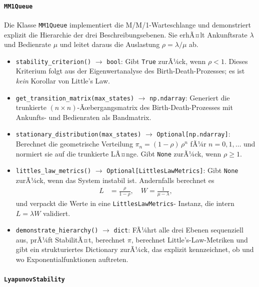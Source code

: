 ﻿\documentclass[a4paper,12pt]{report}
\theoremstyle{definition}
\begin{document}
\paragraph{\texttt{MM1Queue}}

Die Klasse \texttt{MM1Queue} implementiert die M/M/1-Warteschlange
und demonstriert explizit die Hierarchie der drei
Beschreibungsebenen.  Sie erhÃ¤lt Ankunftsrate $\lambda$ und
Bedienrate $\mu$ und leitet daraus die Auslastung $\rho = \lambda/\mu$
ab.

\begin{itemize}
	\item \texttt{stability\_criterion()} $\to$ \texttt{bool}:
	Gibt \texttt{True} zurÃ¼ck, wenn $\rho < 1$.  Dieses
	Kriterium folgt aus der Eigenwertanalyse des
	Birth-Death-Prozesses; es ist \emph{kein} Korollar von
	Little's Law.
	
	\item \texttt{get\_transition\_matrix(max\_states)} $\to$
	\texttt{np.ndarray}:  Generiert die trunkierte
	$(n \times n)$-Ãœbergangsmatrix des Birth-Death-Prozesses mit
	Ankunfts- und Bedienraten als Bandmatrix.
	
	\item \texttt{stationary\_distribution(max\_states)} $\to$
	\texttt{Optional[np.ndarray]}:  Berechnet die geometrische
	Verteilung $\pi_n = (1-\rho)\,\rho^n$ fÃ¼r $n = 0, 1, \ldots$
	und normiert sie auf die trunkierte LÃ¤nge.  Gibt
	\texttt{None} zurÃ¼ck, wenn $\rho \geq 1$.
	
	\item \texttt{littles\_law\_metrics()} $\to$
	\texttt{Optional[LittlesLawMetrics]}:  Gibt \texttt{None}
	zurÃ¼ck, wenn das System instabil ist.  Andernfalls berechnet
	es
	\begin{align}
		L &= \frac{\rho}{1-\rho}, \quad
		W  = \frac{1}{\mu - \lambda},
	\end{align}
	und verpackt die Werte in eine \texttt{LittlesLawMetrics}-
	Instanz, die intern \mbox{$L = \lambda W$} validiert.
	
	\item \texttt{demonstrate\_hierarchy()} $\to$ \texttt{dict}:
	FÃ¼hrt alle drei Ebenen sequenziell aus, prÃ¼ft StabilitÃ¤t,
	berechnet $\pi$, berechnet Little's-Law-Metriken und gibt
	ein strukturiertes Dictionary zurÃ¼ck, das explizit
	kennzeichnet, ob und wo Exponentialfunktionen auftreten.
\end{itemize}

\paragraph{\texttt{LyapunovStability}}
\end{document}
